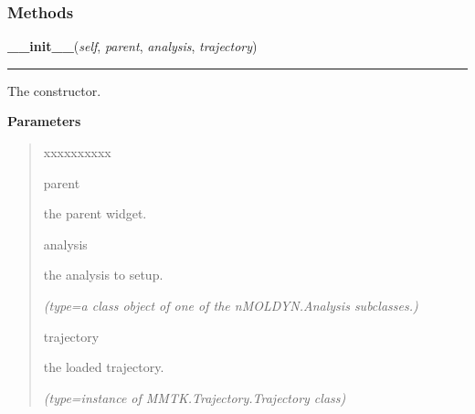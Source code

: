 
  \subsubsection{Methods}

    \label{nMOLDYN:GUI:AnalysisDialog:AnalysisDialog:__init__}

    \vspace{0.5ex}

\hspace{.8\funcindent}\begin{boxedminipage}{\funcwidth}

    \raggedright \textbf{\_\_init\_\_}(\textit{self}, \textit{parent}, \textit{analysis}, \textit{trajectory})

    \vspace{-1.5ex}

    \rule{\textwidth}{0.5\fboxrule}
\setlength{\parskip}{2ex}
    The constructor.

\setlength{\parskip}{1ex}
      \textbf{Parameters}
      \vspace{-1ex}

      \begin{quote}
        \begin{Ventry}{xxxxxxxxxx}

          \item[parent]

          the parent widget.

          \item[analysis]

          the analysis to setup.

            {\it (type=a class object of one of the nMOLDYN.Analysis subclasses.)}

          \item[trajectory]

          the loaded trajectory.

            {\it (type=instance of MMTK.Trajectory.Trajectory class)}

        \end{Ventry}

      \end{quote}

    \end{boxedminipage}

